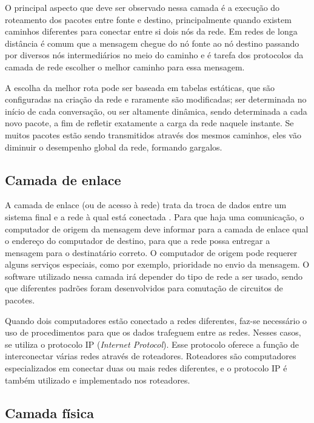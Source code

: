 O principal aspecto que deve ser observado nessa camada é a execução do 
roteamento dos pacotes entre fonte e destino, principalmente quando existem 
caminhos diferentes para conectar entre si dois nós da rede. Em redes de longa 
distância é comum que a mensagem chegue do nó fonte ao nó destino passando por 
diversos nós intermediários no meio do caminho e é tarefa dos protocolos da 
camada de rede escolher o melhor caminho para essa mensagem.

A escolha da melhor rota pode ser baseada em tabelas estáticas, que são 
configuradas na criação da rede e raramente são modificadas; ser 
determinada no início de cada conversação, ou ser altamente dinâmica, sendo 
determinada a cada novo pacote, a fim de refletir exatamente a carga da rede 
naquele instante. Se muitos pacotes estão sendo transmitidos através dos mesmos 
caminhos, eles vão diminuir o desempenho global da rede, formando gargalos.\\

\subsection{Camada de enlace}

A camada de enlace (ou de acesso à rede) trata da troca de dados entre um 
sistema final e a rede à qual está conectada \cite{stallings2005}. Para que 
haja uma comunicação, o computador de origem da mensagem deve informar para a 
camada de enlace qual o endereço do computador de destino, para que a rede 
possa entregar a mensagem para o destinatário correto. O computador de origem 
pode requerer alguns serviços especiais, como por exemplo, prioridade no envio 
da mensagem. O software utilizado nessa camada irá depender do tipo de rede a 
ser usado, sendo que diferentes padrões foram desenvolvidos para comutação de 
circuitos de pacotes.

Quando dois computadores estão conectado a redes diferentes, faz-se necessário 
o uso de procedimentos para que os dados trafeguem entre as redes. Nesses 
casos, se utiliza o protocolo IP (\textit{Internet Protocol}). Esse protocolo 
oferece a função de interconectar várias redes através de roteadores. 
Roteadores são computadores especializados em conectar duas ou mais redes 
diferentes, e o protocolo IP é também utilizado e implementado nos roteadores.

\subsection{Camada física}

